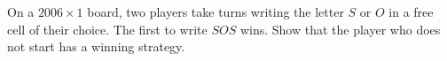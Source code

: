 On a $2006 \times 1$ board, two players take turns writing the letter $S$ or $O$ in a free cell of their choice. The first to write $SOS$ wins. Show that the player who does not start has a winning strategy.
